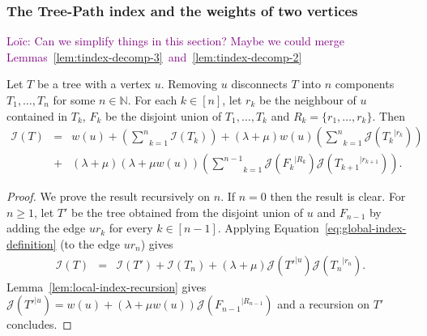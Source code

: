 \documentclass[11 pt]{modarticle}
\newcommand{\cN}{\mathbb{N}}
\newcommand{\wmap}{w}
\newcommand{\rtree}[2]{{#1}^{\lvert #2}}
\newcommand{\indexsymbol}{\mathcal{I}}
\newcommand{\tindex}[1]{\indexsymbol(#1)}
\newcommand{\rindexsymbol}{\mathcal{J}}
\newcommand{\rindex}[2]{\rindexsymbol(\rtree{#2}{#1})}
\newcommand{\ldcomment}[1]{\textcolor{purple}{{\footnotesize Loïc:} #1}}
\begin{document}
\subsubsection{The Tree-Path index and the weights of two vertices}

\ldcomment{Can we simplify things in this section? Maybe we could merge Lemmas~\ref{lem:tindex-decomp-3}~and~\ref{lem:tindex-decomp-2}}

\begin{lem}\label{lem:tindex-decomp-1}
Let $T$ be a tree with a vertex $u$. Removing $u$ disconnects $T$ into $n$ components $T_1,\dots, T_n$ for some $n\in \cN$. For each $k\in[n]$, let $r_k$ be the neighbour of $u$ contained in $T_k$, $F_k$ be the disjoint union of $T_1, \dots, T_k$ and $R_k = \{r_1, \dots, r_k\}$. Then
\begin{eqnarray*}
	\tindex{T} & = & \wmap(u) + \left(\underset{k=1}{\overset{n}{\sum}} \tindex{T_k}\right) + (\lambda + \mu)\wmap(u)\left(\underset{k=1}{\overset{n}{\sum}}\rindex{r_k}{T_k}\right) \\
	& + & (\lambda + \mu)(\lambda + \mu \wmap(u))\left(\underset{k=1}{\overset{n-1}{\sum}}\rindex{R_k}{F_k}\rindex{r_{k+1}}{T_{k+1}}\right).
\end{eqnarray*}
\end{lem}

\begin{proof}
We prove the result recursively on $n$. If $n = 0$ then the result is clear. %
For $n \geq 1$, let $T'$ be the tree obtained from the disjoint union of $u$ and $F_{n-1}$ by adding the edge $u r_k$ for every $k \in [n-1]$. Applying Equation~\eqref{eq:global-index-definition} (to the edge $u r_n$) gives
\begin{eqnarray*}
	\tindex{T} & = & \tindex{T'} + \tindex{T_n} + (\lambda + \mu) \rindex{u}{T'} \rindex{r_n}{T_n}.
\end{eqnarray*}
Lemma~\ref{lem:local-index-recursion} gives $\rindex{u}{T'} = \wmap(u) + (\lambda + \mu \wmap(u)) \rindex{R_{n-1}}{F_{n-1}}$ and a recursion on $T'$ concludes.
\end{proof}
\end{document}
